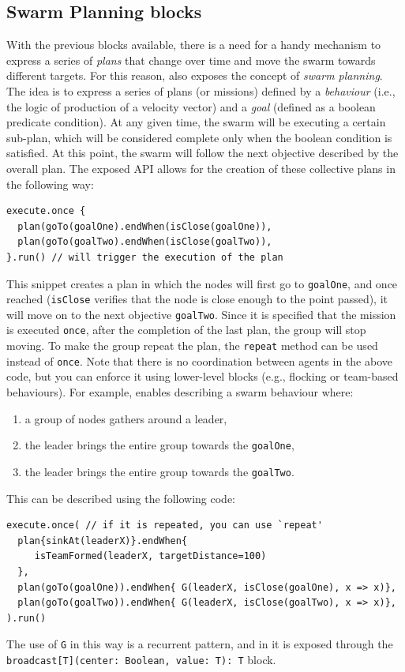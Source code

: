 \subsection{Swarm Planning blocks}\label{coordination2023-macro:subsec:planner} 
With the previous blocks available, there is a need for a handy mechanism to express a series of \emph{plans} that 
 change over time and move the swarm towards different targets. 
%
For this reason, \MacroSwarm{} also exposes the concept of \emph{swarm planning}. 
The idea is to express a series of plans (or missions)
 defined by a \emph{behaviour} 
 (i.e., the logic of production of a velocity vector) 
 and a \emph{goal} (defined as a boolean predicate condition). 
%
At any given time, the swarm will be executing a certain sub-plan, 
 which will be considered complete only when the boolean condition is satisfied. 
%
At this point, the swarm will follow the next objective described by the overall plan.
%
The exposed API allows for the creation of these collective plans in the following way:
\begin{lstlisting}
execute.once {
  plan(goTo(goalOne).endWhen(isClose(goalOne)),
  plan(goTo(goalTwo).endWhen(isClose(goalTwo)),
}.run() // will trigger the execution of the plan
\end{lstlisting}
This snippet creates a plan 
 in which the nodes will first go to \lstinline|goalOne|, 
 and once reached (\lstinline|isClose| verifies that the node is close enough to the point passed), 
 it will move on to the next objective \lstinline|goalTwo|.
Since it is specified that the mission is executed \lstinline|once|, 
 after the completion of the last plan, the group will stop moving.
To make the group repeat the plan, 
 the \lstinline|repeat| method can be used instead of \lstinline|once|.
%
Note that there is no coordination between agents in the above code, 
 but you can enforce it using lower-level blocks (e.g., flocking or team-based behaviours).
%
For example, \MacroSwarm{} enables describing a swarm behaviour where:
\begin{enumerate}
  \item a group of nodes gathers around a leader,
  \item the leader brings the entire group towards the \lstinline|goalOne|,
  \item the leader brings the entire group towards the \lstinline|goalTwo|.
\end{enumerate}
%
This can be described using the following code:
\begin{lstlisting}[xrightmargin=-5pt]
execute.once( // if it is repeated, you can use `repeat'
  plan{sinkAt(leaderX)}.endWhen{
     isTeamFormed(leaderX, targetDistance=100)
  },
  plan(goTo(goalOne)).endWhen{ G(leaderX, isClose(goalOne), x => x)},
  plan(goTo(goalTwo)).endWhen{ G(leaderX, isClose(goalTwo), x => x)},
).run()
\end{lstlisting}
The use of \lstinline|G| in this way is a recurrent pattern, 
 and in \scafi{} it is exposed through the \lstinline|broadcast[T](center: Boolean, value: T): T| block.
 
